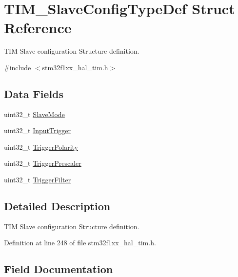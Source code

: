 \hypertarget{struct_t_i_m___slave_config_type_def}{}\section{T\+I\+M\+\_\+\+Slave\+Config\+Type\+Def Struct Reference}
\label{struct_t_i_m___slave_config_type_def}


T\+IM Slave configuration Structure definition.  




{\ttfamily \#include $<$stm32f1xx\+\_\+hal\+\_\+tim.\+h$>$}

\subsection*{Data Fields}
\begin{DoxyCompactItemize}
\item 
uint32\+\_\+t \hyperlink{struct_t_i_m___slave_config_type_def_aa2b0001c7fceb00968ca503040874b4a}{Slave\+Mode}
\item 
uint32\+\_\+t \hyperlink{struct_t_i_m___slave_config_type_def_a11eb45de70bcf3e3111a2d39bfc77074}{Input\+Trigger}
\item 
uint32\+\_\+t \hyperlink{struct_t_i_m___slave_config_type_def_afd12184c6e590581c775504a2e6c048c}{Trigger\+Polarity}
\item 
uint32\+\_\+t \hyperlink{struct_t_i_m___slave_config_type_def_aa2906798e3808ed40ac203a741512b55}{Trigger\+Prescaler}
\item 
uint32\+\_\+t \hyperlink{struct_t_i_m___slave_config_type_def_aef9e224ccafea4bfdd64193ea84feaf3}{Trigger\+Filter}
\end{DoxyCompactItemize}


\subsection{Detailed Description}
T\+IM Slave configuration Structure definition. 

Definition at line 248 of file stm32f1xx\+\_\+hal\+\_\+tim.\+h.



\subsection{Field Documentation}
\mbox{\label{struct_t_i_m___slave_config_type_def_a11eb45de70bcf3e3111a2d39bfc77074}} 

